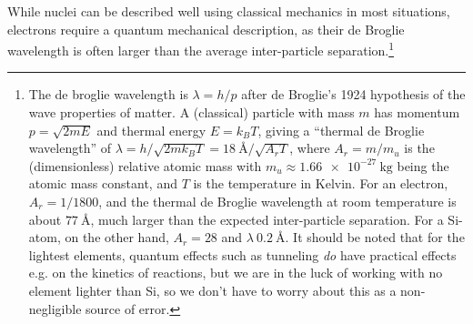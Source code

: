 \documentclass[11pt,bibliography=totoc,index=totoc]{scrbook}   %
\begin{document}
While nuclei can be described well using classical mechanics in most situations, electrons require a quantum mechanical description, as their de Broglie wavelength
is often larger than the average inter-particle separation.\footnote{The de broglie wavelength is $\lambda=h/p$ after de Broglie's 1924 hypothesis of the wave properties of matter.\cite{deBroglie:1924} A (classical) particle with mass $m$ has momentum $p=\sqrt{2mE}$ and thermal energy $E=k_BT$, giving a ``thermal de Broglie wavelength''\cite[114]{Styer:2007} of $\lambda=h/\sqrt{2mk_BT}=\SI{18}{\angstrom}/\sqrt{A_r T}$, where $A_r=m/m_u$ is the (dimensionless) relative atomic mass with
$m_u\approx\SI{1.66e-27}{\kilogram}$ being the atomic mass constant, and $T$ is the temperature in Kelvin. For an electron, $A_r=1/1800$, and the thermal de Broglie wavelength at room temperature is about $\SI{77}{\angstrom}$, much larger than the expected inter-particle separation. For a Si-atom, on the other hand, $A_r=28$ and $\lambda ~ \SI{0.2}{\angstrom}$. It should be noted that for the lightest elements, quantum effects such as tunneling \emph{do} have practical effects e.g. on the kinetics of reactions, but we are in the luck of working with no element lighter than Si, so we don't have to worry about this as a non-negligible source of error.}


\end{document}
